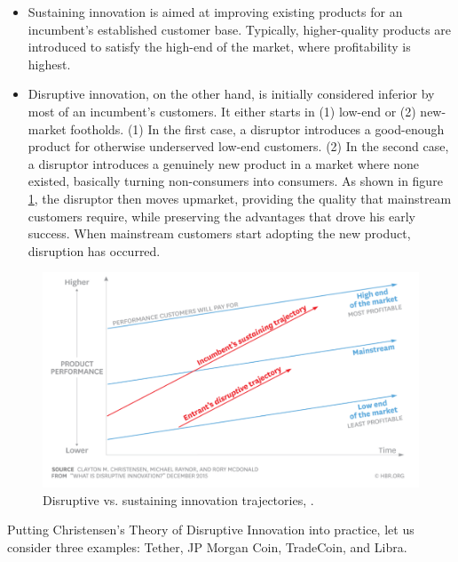 \documentclass[conference]{IEEEtran}
\begin{document}
\begin{itemize}
	\item Sustaining innovation is aimed at improving existing products for an incumbent's established customer base. Typically, higher-quality products are introduced to satisfy the high-end of the market, where profitability is highest.
	\item Disruptive innovation, on the other hand, is initially considered inferior by most of an incumbent’s customers. It either starts in (1) low-end or (2) new-market footholds. (1) In the first case, a disruptor introduces a good-enough product for otherwise underserved low-end customers. (2) In the second case, a disruptor introduces a genuinely new product in a market where none existed, basically turning non-consumers into consumers. As shown in figure \ref{fig:disruption}, the disruptor then moves upmarket, providing the quality that mainstream customers require, while preserving the advantages that drove his early success. When mainstream customers start adopting the new product, disruption has occurred.
\end{itemize}

\begin{figure}[htbp]
	\centerline{
		\includegraphics[width=\linewidth]{assets/disruptiveInnovation.png}
		}
	\caption{Disruptive vs. sustaining innovation trajectories, \cite{Christensen}.}
	\label{fig:disruption}
\end{figure}

Putting Christensen's Theory of Disruptive Innovation into practice, let us consider three examples: Tether, JP Morgan Coin, TradeCoin, and Libra.
\end{document}
